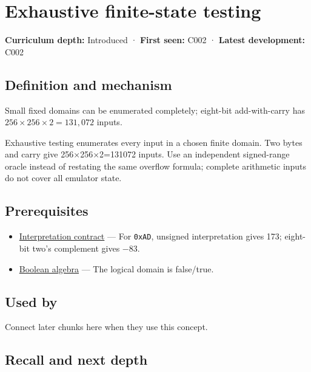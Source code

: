 \hypertarget{appendix-05db24ccc28a}{}\label{referencestart:appendix-05db24ccc28a}
\section{Exhaustive finite-state testing}\label{appendix-05db24ccc28a-exhaustive-finite-state-testing}

\textbf{Curriculum depth:} Introduced · \textbf{First seen:} C002 · \textbf{Latest development:} C002

\subsection{Definition and mechanism}\label{appendix-05db24ccc28a-definition-and-mechanism}

Small fixed domains can be enumerated completely; eight-bit add-with-carry has \(256\times256\times2=131{,}072\) inputs.

Exhaustive testing enumerates every input in a chosen finite domain. Two bytes and carry give 256×256×2=131072 inputs. Use an independent signed-range oracle instead of restating the same overflow formula; complete arithmetic inputs do not cover all emulator state.

\subsection{Prerequisites}\label{appendix-05db24ccc28a-prerequisites}

\begin{itemize}
\tightlist
\item
  \hyperref[appendix-f414bd4ed05c]{Interpretation contract} --- For \texttt{0xAD}, unsigned interpretation gives 173; eight-bit two's complement gives −83.
\item
  \hyperref[appendix-24475e1596a8]{Boolean algebra} --- The logical domain is false/true.
\end{itemize}

\subsection{Used by}\label{appendix-05db24ccc28a-used-by}

Connect later chunks here when they use this concept.

\subsection{Recall and next depth}\label{appendix-05db24ccc28a-recall-and-next-depth}

